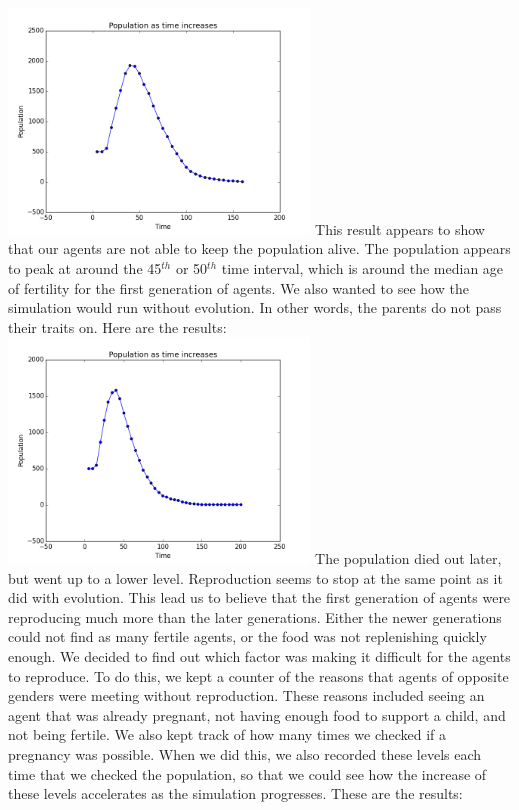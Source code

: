 \documentclass[11pt]{article}
\begin{document}
\begin{multicols}{2}
\includegraphics[width=80mm]{Population500.png} \newline
This result appears to show that our agents are not able to keep the population alive. The population appears to peak at around the 45$^{th}$ or 50$^{th}$ time interval, which is around the median age of fertility for the first generation of agents. We also wanted to see how the simulation would run without evolution. In other words, the parents do not pass their traits on. Here are the results: \newline
\includegraphics[width=80mm]{Population500noevo.png} \newline
The population died out later, but went up to a lower level. \newline
Reproduction seems to stop at the same point as it did with evolution.
This lead us to believe that the first generation of agents were reproducing much more than the later generations. Either the newer generations could not find as many fertile agents, or the food was not replenishing quickly enough. We decided to find out which factor was making it difficult for the agents to reproduce.
\newline
To do this, we kept a counter of the reasons that agents of opposite genders were meeting without reproduction. These reasons included seeing an agent that was already pregnant, not having enough food to support a child, and not being fertile. We also kept track of how many times we checked if a pregnancy was possible. When we did this, we also recorded these levels each time that we checked the population, so that we could see how the increase of these levels accelerates as the simulation progresses. These are the results: \newline

\end{multicols}
\end{document}
